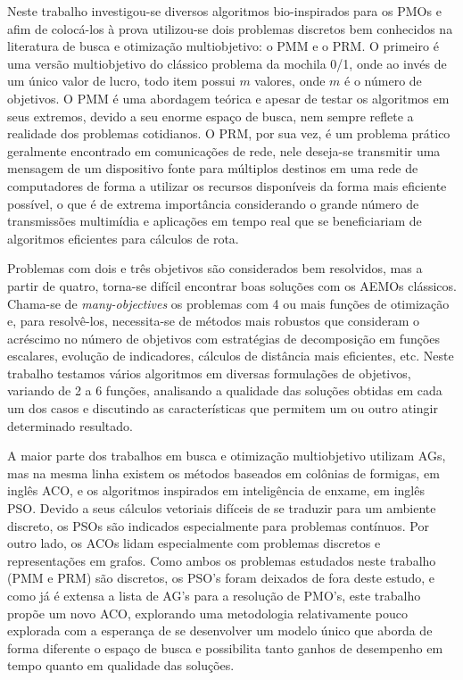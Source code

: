 Neste trabalho investigou-se diversos algoritmos bio-inspirados para os \acp{PMO} e afim de colocá-los à prova utilizou-se dois problemas discretos bem conhecidos na literatura de busca e otimização multiobjetivo: o \ac{PMM} e o \ac{PRM}. O primeiro é uma versão multiobjetivo do clássico problema da mochila 0/1, onde ao invés de um único valor de lucro, todo item possui $m$ valores, onde $m$ é o número de objetivos. O \ac{PMM} é uma abordagem teórica e apesar de testar os algoritmos em seus extremos, devido a seu enorme espaço de busca, nem sempre reflete a realidade dos problemas cotidianos. O \ac{PRM}, por sua vez, é um problema prático geralmente encontrado em comunicações de rede, nele deseja-se transmitir uma mensagem de um dispositivo fonte para múltiplos destinos em uma rede de computadores de forma a utilizar os recursos disponíveis da forma mais eficiente possível, o que é de extrema importância considerando o grande número de transmissões multimídia e aplicações em tempo real que se beneficiariam de algoritmos eficientes para cálculos de rota.

Problemas com dois e três objetivos são considerados bem resolvidos, mas a partir de quatro, torna-se difícil encontrar boas soluções com os \acp{AEMO} clássicos. Chama-se de \textit{many-objectives} os problemas com 4 ou mais funções de otimização e, para resolvê-los, necessita-se de métodos mais robustos que consideram o acréscimo no número de objetivos com estratégias de decomposição em funções escalares, evolução de indicadores, cálculos de distância mais eficientes, etc. Neste trabalho testamos vários algoritmos em diversas formulações de objetivos, variando de 2 a 6 funções, analisando a qualidade das soluções obtidas em cada um dos casos e discutindo as características que permitem um ou outro atingir determinado resultado.

A maior parte dos trabalhos em busca e otimização multiobjetivo utilizam \acp{AG}, mas na mesma linha existem os métodos baseados em colônias de formigas, em inglês \ac{ACO}, e os algoritmos inspirados em inteligência de enxame, em inglês \ac{PSO}. Devido a seus cálculos vetoriais difíceis de se traduzir para um ambiente discreto, os \acp{PSO} são indicados especialmente para problemas contínuos. Por outro lado, os \acp{ACO} lidam especialmente com problemas discretos e representações em grafos. Como ambos os problemas estudados neste trabalho (\ac{PMM} e \ac{PRM}) são discretos, os \ac{PSO}'s foram deixados de fora deste estudo, e como já é extensa a lista de AG's para a resolução de PMO's, este trabalho propõe um novo \ac{ACO}, explorando uma metodologia relativamente pouco explorada com a esperança de se desenvolver um modelo único que aborda de forma diferente o espaço de busca e possibilita tanto ganhos de desempenho em tempo quanto em qualidade das soluções.

